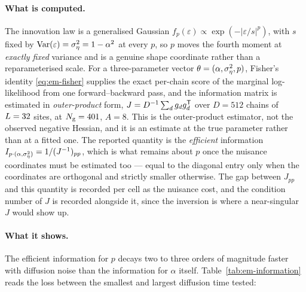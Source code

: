 \paragraph{What is computed.} The innovation law is a generalised Gaussian
$f_p(\varepsilon) \propto \exp(-|\varepsilon/s|^{p})$, with $s$ fixed by
$\operatorname{Var}(\varepsilon) = \sigma_\eta^2 = 1-\alpha^2$ at every $p$, so
$p$ moves the fourth moment at \emph{exactly fixed} variance and is a
genuine shape coordinate rather than a reparameterised scale. For a
three-parameter vector $\theta = (\alpha, \sigma_\eta^2, p)$, Fisher's identity
\eqref{eq:em-fisher} supplies the exact per-chain score of the marginal
log-likelihood from one forward--backward pass, and the information matrix
is estimated in \emph{outer-product} form, $J = D^{-1}\sum_d g_d g_d^{\mathsf{T}}$
over $D=512$ chains of $L=32$ sites, at $N_{\mathrm{g}}=401$, $A=8$. This is the
outer-product estimator, not the observed negative Hessian, and it is an
estimate at the true parameter rather than at a fitted one. The reported
quantity is the \emph{efficient} information
$I_{p\cdot(\alpha,\sigma_\eta^2)} = 1/(J^{-1})_{pp}$, which is what remains
about $p$ once the nuisance coordinates must be estimated too --- equal
to the diagonal entry only when the coordinates are orthogonal and strictly
smaller otherwise. The gap between $J_{pp}$ and this quantity is
recorded per cell as the nuisance cost, and the condition number of $J$ is
recorded alongside it, since the inversion is where a near-singular $J$
would show up.

\paragraph{What it shows.} The efficient information for $p$ decays two
to three orders of magnitude faster with diffusion noise than the
information for $\alpha$ itself. Table~\ref{tab:em-information} reads the loss
between the smallest and largest diffusion time tested:

